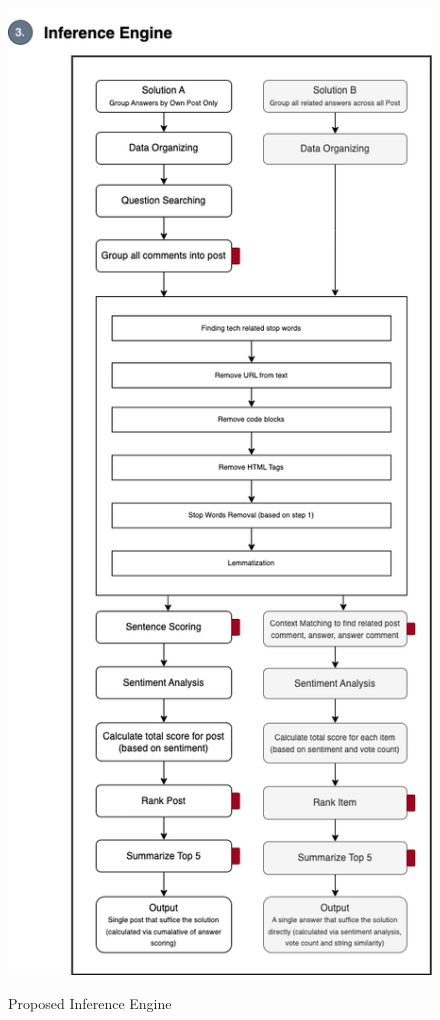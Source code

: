 \begin{figure}[H]
  \noindent \includegraphics[scale=0.6]{inference-eng.png}\\ 
  \caption{Proposed Inference Engine}
  \label{inferece_engine}
\end{figure}


